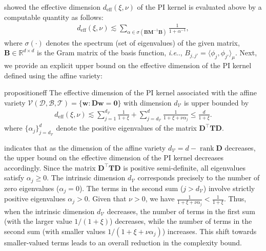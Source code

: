 \documentclass{article}
\makeatletter
\def\mB{{\bm{B}}}
\def\mD{{\bm{D}}}
\def\mM{{\bm{M}}}
\def\mT{{\bm{T}}}
\def\emB{{B}}
\def\@onedot{\ifx\@let@token.\else.\null\fi\xspace}
\DeclareRobustCommand\onedot{\futurelet\@let@token\@onedot}
\def\ie{\emph{i.e}\onedot}
\theoremstyle{plain}
\theoremstyle{definition}
\theoremstyle{remark}
\makeatother
\begin{document}
\citet{doumeche2024physics2} showed the effective dimension \( d_{\mathrm{eff}}(\xi, \nu) \) of the PI kernel is evaluated above by a computable quantity as follows:
\begin{gather}
    \label{eq:effective-dim-ub}
    d_{\mathrm{eff}}(\xi, \nu) \lesssim \sum_{\alpha \in \sigma\left(\mB\mM^{-1}\mB\right)} \frac{1}{1 + \alpha^{-1}},
\end{gather}
where \( \sigma(\cdot) \) denotes the spectrum (set of eigenvalues) of the given matrix, \(\mB \in \mathbb{R}^{d \times d}\) is the Gram matrix of the basis function, \ie, \(\emB_{j, j'} = \langle \phi_j, \phi_{j'} \rangle_{\mu} \).
Next, we provide an explicit upper bound on the effective dimension of the PI kernel defined using the affine variety:
\begin{restatable}{proposition}{eff}\label{thm:pi-kernel}
    The effective dimension of the PI kernel associated with the affine variety \( \mathcal{V}(\mathscr{D}, \mathcal{B}, \mathcal{T}) = \{ \bm{w} : \mD\bm{w} = \bm{0} \} \) with dimension \( d_{\mathcal{V}} \) is upper bounded by
    \begin{align*}
       d_{\mathrm{eff}}(\xi, \nu) \lesssim  \sum_{j=1}^{d_{\mathcal{V}}} \frac{1}{1 + \xi} + \sum_{j=d_{\mathcal{V}}}^{d} \frac{1}{1 + \xi + \nu \alpha_j} \leq \frac{d}{1 + \xi}.
    \end{align*}
    where \( \{\alpha_j\}_{j=d_{\mathcal{V}}}^d \) denote the positive eigenvalues of the matrix \(\mD^{\top}\mT\mD\).
\end{restatable}

 indicates that as the dimension of the affine variety \( d_{\mathcal{V}} = d - \operatorname{rank} \mD \) decreases, the upper bound on the effective dimension of the PI kernel decreases accordingly.
Since the matrix $\mD^{\top}\mT\mD$ is positive semi-definite, all eigenvalues satisfy $\alpha_j \geq 0$. The intrinsic dimension $d_{\mathcal{V}}$ corresponds precisely to the number of zero eigenvalues ($\alpha_j = 0$). The terms in the second sum ($j > d_{\mathcal{V}}$) involve strictly positive eigenvalues $\alpha_j > 0$. Given that $\nu > 0$, we have $\frac{1}{1 + \xi + \nu\alpha_j} < \frac{1}{1 + \xi}$. Thus, when the intrinsic dimension $d_{\mathcal{V}}$ decreases, the number of terms in the first sum (with the larger value $1/(1 + \xi)$) decreases, while the number of terms in the second sum (with smaller values $1/(1 + \xi + \nu\alpha_j)$) increases. This shift towards smaller-valued terms leads to an overall reduction in the complexity bound.
\end{document}
